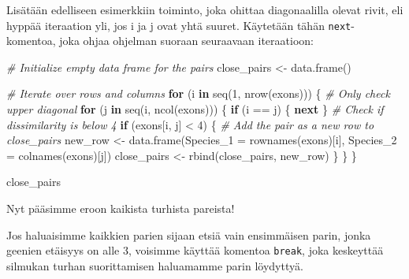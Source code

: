\documentclass[
]{book}
\newenvironment{Shaded}{\begin{snugshade}}{\end{snugshade}}
\newcommand{\AttributeTok}[1]{\textcolor[rgb]{0.77,0.63,0.00}{#1}}
\newcommand{\CommentTok}[1]{\textcolor[rgb]{0.56,0.35,0.01}{\textit{#1}}}
\newcommand{\ControlFlowTok}[1]{\textcolor[rgb]{0.13,0.29,0.53}{\textbf{#1}}}
\newcommand{\DecValTok}[1]{\textcolor[rgb]{0.00,0.00,0.81}{#1}}
\newcommand{\FunctionTok}[1]{\textcolor[rgb]{0.00,0.00,0.00}{#1}}
\newcommand{\NormalTok}[1]{#1}
\newcommand{\OtherTok}[1]{\textcolor[rgb]{0.56,0.35,0.01}{#1}}
\newcommand{\SpecialCharTok}[1]{\textcolor[rgb]{0.00,0.00,0.00}{#1}}
\begin{document}
Lisätään edelliseen esimerkkiin toiminto, joka ohittaa diagonaalilla olevat rivit, eli hyppää iteraation yli, jos i ja j ovat yhtä suuret. Käytetään tähän \texttt{next}-komentoa, joka ohjaa ohjelman suoraan seuraavaan iteraatioon:

\begin{Shaded}
\begin{Highlighting}[]
\CommentTok{\# Initialize empty data frame for the pairs}
\NormalTok{close\_pairs }\OtherTok{\textless{}{-}} \FunctionTok{data.frame}\NormalTok{()}

\CommentTok{\# Iterate over rows and columns}
\ControlFlowTok{for}\NormalTok{ (i }\ControlFlowTok{in} \FunctionTok{seq}\NormalTok{(}\DecValTok{1}\NormalTok{, }\FunctionTok{nrow}\NormalTok{(exons))) \{}
  \CommentTok{\# Only check upper diagonal}
  \ControlFlowTok{for}\NormalTok{ (j }\ControlFlowTok{in} \FunctionTok{seq}\NormalTok{(i, }\FunctionTok{ncol}\NormalTok{(exons))) \{}
    \ControlFlowTok{if}\NormalTok{ (i }\SpecialCharTok{==}\NormalTok{ j) \{}
        \ControlFlowTok{next}
\NormalTok{    \}}
    \CommentTok{\# Check if dissimilarity is below 4}
    \ControlFlowTok{if}\NormalTok{ (exons[i, j] }\SpecialCharTok{\textless{}} \DecValTok{4}\NormalTok{) \{}
      \CommentTok{\# Add the pair as a new row to close\_pairs}
\NormalTok{      new\_row }\OtherTok{\textless{}{-}} \FunctionTok{data.frame}\NormalTok{(}\AttributeTok{Species\_1 =} \FunctionTok{rownames}\NormalTok{(exons)[i],}
                            \AttributeTok{Species\_2 =} \FunctionTok{colnames}\NormalTok{(exons)[j])}
\NormalTok{      close\_pairs }\OtherTok{\textless{}{-}} \FunctionTok{rbind}\NormalTok{(close\_pairs,}
\NormalTok{                           new\_row)}
\NormalTok{    \}}
\NormalTok{  \}}
\NormalTok{\}}

\NormalTok{close\_pairs}
\end{Highlighting}
\end{Shaded}

Nyt pääsimme eroon kaikista turhista pareista!

Jos haluaisimme kaikkien parien sijaan etsiä vain ensimmäisen parin, jonka geenien etäisyys on alle 3, voisimme käyttää komentoa \texttt{break}, joka keskeyttää silmukan turhan suorittamisen haluamamme parin löydyttyä.
\end{document}
